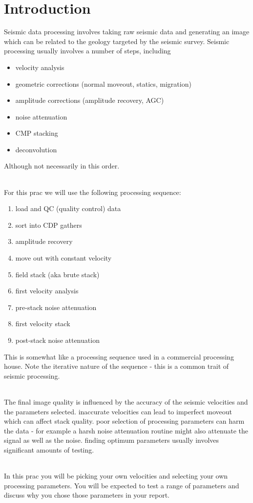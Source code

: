\section{Introduction}
Seismic data processing involves taking raw seismic data and generating an image which can be related to the geology targeted by the seismic survey.  Seismic processing usually involves a number of steps, including
\begin{itemize}
\item velocity analysis
\item geometric corrections (normal moveout,  statics, migration)
\item amplitude corrections (amplitude recovery, AGC)
\item noise attenuation
\item CMP stacking
\item deconvolution
\end{itemize}
Although not necessarily in this order.
\par~\\
For this prac we will use the following processing sequence:
\begin{enumerate}
\item load and QC (quality control) data
\item sort into CDP gathers
\item amplitude recovery
\item move out with constant velocity
\item field stack (aka brute stack)
\item first velocity analysis
\item pre-stack noise attenuation
\item first velocity stack
\item post-stack noise attenuation
\end{enumerate}
This is somewhat like a processing sequence used in a commercial processing house.  Note the iterative nature of the sequence - this is a common trait of seismic processing.
\par~\\
The final image quality is influenced by the accuracy of the seismic velocities and the parameters selected.  inaccurate velocities can lead to imperfect moveout which can affect stack quality.  poor selection of processing parameters can harm the data - for example a harsh noise attenuation routine might also attenuate the signal as well as the noise. finding optimum parameters usually involves significant amounts of testing.
\par~\\
In this prac you will be picking your own velocities and selecting your own processing parameters.  You will be expected to test a range of parameters and discuss why you chose those parameters in your report.  
